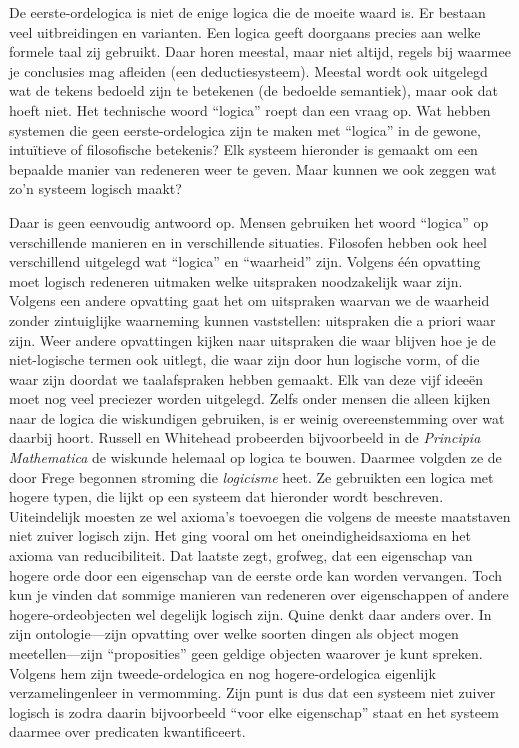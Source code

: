 \documentclass[openany]{memoir}
\begin{document}
De eerste-ordelogica is niet de enige logica die de moeite waard is.
Er bestaan veel uitbreidingen en varianten. Een logica geeft doorgaans
precies aan welke formele taal zij gebruikt. Daar horen meestal, maar
niet altijd, regels bij waarmee je conclusies mag afleiden (een
deductiesysteem). Meestal wordt ook uitgelegd wat de tekens bedoeld zijn
te betekenen (de bedoelde semantiek), maar ook dat hoeft niet. Het
technische woord ``logica'' roept dan een vraag op. Wat hebben systemen
die geen eerste-ordelogica zijn te maken met ``logica'' in de gewone,
intuïtieve of filosofische betekenis? Elk systeem hieronder is gemaakt
om een bepaalde manier van redeneren weer te geven. Maar kunnen we ook
zeggen wat zo'n systeem logisch maakt?

Daar is geen eenvoudig antwoord op. Mensen gebruiken het woord
``logica'' op verschillende manieren en in verschillende situaties.
Filosofen hebben ook heel verschillend uitgelegd wat ``logica'' en
``waarheid'' zijn. Volgens één opvatting moet logisch redeneren uitmaken
welke uitspraken noodzakelijk waar zijn. Volgens een andere opvatting
gaat het om uitspraken waarvan we de waarheid zonder zintuiglijke
waarneming kunnen vaststellen: uitspraken die a priori waar zijn. Weer
andere opvattingen kijken naar uitspraken die waar blijven hoe je de
niet-logische termen ook uitlegt, die waar zijn door hun logische vorm,
of die waar zijn doordat we taalafspraken hebben gemaakt. Elk van deze
vijf ideeën moet nog veel preciezer worden uitgelegd. Zelfs onder
mensen die alleen kijken naar de logica die wiskundigen gebruiken, is
er weinig overeenstemming over wat daarbij hoort. Russell en Whitehead
probeerden bijvoorbeeld in de \textit{Principia Mathematica} de
wiskunde helemaal op logica te bouwen. Daarmee volgden ze de door Frege
begonnen stroming die {\em logicisme} heet. Ze gebruikten een logica met
hogere typen, die lijkt op een systeem dat hieronder wordt beschreven.
Uiteindelijk moesten ze wel axioma's toevoegen die volgens de meeste
maatstaven niet zuiver logisch zijn. Het ging vooral om het
oneindigheidsaxioma en het axioma van reducibiliteit. Dat laatste zegt,
grofweg, dat een eigenschap van hogere orde door een eigenschap van de
eerste orde kan worden vervangen. Toch kun je vinden dat sommige
manieren van redeneren over eigenschappen of andere hogere-ordeobjecten
wel degelijk logisch zijn. Quine denkt daar anders over. In zijn
ontologie---zijn opvatting over welke soorten dingen als object mogen
meetellen---zijn ``proposities'' geen geldige objecten waarover je kunt
spreken. Volgens hem zijn tweede-ordelogica en nog hogere-ordelogica
eigenlijk verzamelingenleer in vermomming. Zijn punt is dus dat een
systeem niet zuiver logisch is zodra daarin bijvoorbeeld ``voor elke
eigenschap'' staat en het systeem daarmee over predicaten
kwantificeert.
\end{document}
